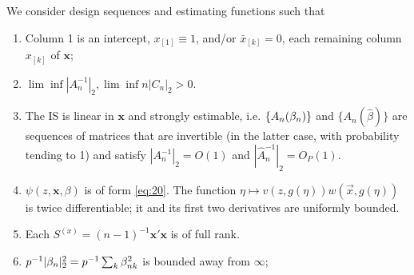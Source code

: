\documentclass{article}
\theoremstyle{remark}
\begin{document}
We consider design sequences and estimating functions such that 
\renewcommand{\theenumi}{A\arabic{enumi}}
\begin{enumerate}
\item \label{A-centering} Column 1 is an intercept, $x_{[1]} \equiv 1$, and/or $\bar{x}_{[k]}=0$, each remaining column $x_{[k]}$ of $\mathbf{x}$;
\item \label{A-boundedinfo}
$\lim\inf |A_{n}^{-1}|_{2},  \lim\inf n|C_{n}|_{2} > 0 $.
\item\label{A-estimable} The IS is linear in $\mathbf{x}$ and strongly estimable, i.e.  $\{A_{n}(\betatrue)\}$ and $\{A_{n}(\hat\beta)\}$ are sequences of matrices that are invertible (in the latter case, with probability tending to 1) and satisfy $|{A}_{n}^{-1}|_{2}=O(1)$ and $|\hat{A}_{n}^{-1}|_{2}= O_{P}(1)$. 
\item \label{A-psismooth} $\psi(z, \mathbf{x}, \beta)$ is of form \eqref{eq:20}. The function $\eta \mapsto v(z, g(\eta))w(\vec{x}, g(\eta))$ is twice differentiable; it and its first two derivatives are uniformly bounded. 
\item \label{A-Sfullrank} Each $S^{(x)} = (n-1)^{-1}\mathbf{x}'\mathbf{x}$ is of full rank.
\item \label{A-regPS} $p^{-1}|\betatrue|_{2}^{2} = p^{-1} \sum_k \betatrue[k]^2$ is bounded away from $\infty$;

\end{enumerate}
\end{document}

